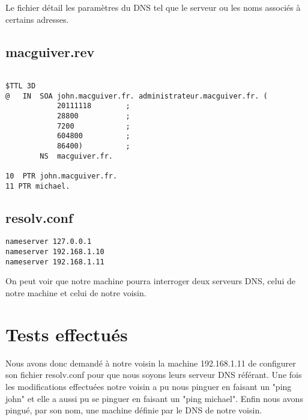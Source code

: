 Le fichier détail les paramètres du DNS tel que le serveur ou les noms associés à certains adresses.

\subsection{macguiver.rev}
\begin{verbatim}

$TTL 3D
@	IN	SOA	john.macguiver.fr. administrateur.macguiver.fr. (
			20111118        ;
			28800           ;
			7200            ;
			604800          ;   
			86400)          ;
		NS	macguiver.fr.

10  PTR john.macguiver.fr.
11 PTR michael.
\end{verbatim}
\subsection{resolv.conf}
\begin{verbatim}
nameserver 127.0.0.1
nameserver 192.168.1.10
nameserver 192.168.1.11
\end{verbatim}
On peut voir que notre machine pourra interroger deux serveurs DNS, celui de notre machine et celui de notre voisin.

\section{Tests effectués}
Nous avons donc demandé à notre voisin la machine 192.168.1.11 de configurer son fichier resolv.conf pour que nous soyons leurs serveur DNS référant. Une fois les modifications effectuées notre voisin a pu nous pinguer en faisant un "ping john" et elle a aussi pu se pinguer en faisant un "ping michael".
Enfin nous avons pingué, par son nom, une machine définie par le DNS de notre voisin.

\clearpage

